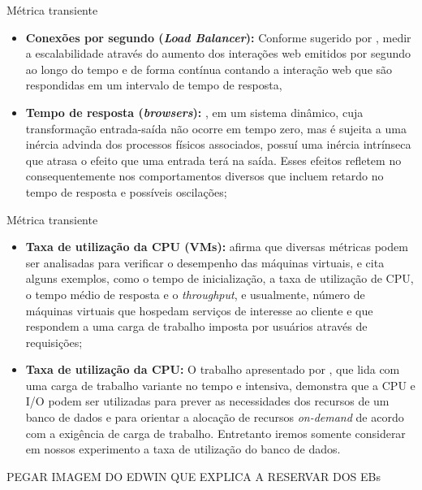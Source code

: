 \begin{frame}{Métrica transiente}
	\begin{itemize}
		\item \textbf{Conexões por segundo (\textit{Load Balancer}):} Conforme sugerido por \cite{Binnig2009}, medir a escalabilidade através do aumento dos interações web emitidos por segundo ao longo do tempo e de forma contínua contando a interação web que são respondidas em um intervalo de tempo de resposta,
		
		\item \textbf{Tempo de resposta (\textit{browsers}):} \cite{helder2014}, em um sistema dinâmico, cuja transformação entrada-saída não ocorre em tempo zero, mas é sujeita a uma inércia advinda dos processos físicos associados, possuí uma inércia intrínseca que atrasa o efeito que uma entrada terá na saída. Esses efeitos refletem no consequentemente nos comportamentos diversos que incluem retardo no tempo de resposta e possíveis oscilações; 	
	
	\end{itemize}
\end{frame}

\begin{frame}{Métrica transiente}
	\begin{itemize}
		\item \textbf{Taxa de utilização da CPU (VMs):} \cite{Nobile2013} afirma que diversas métricas podem ser analisadas para verificar o desempenho das máquinas virtuais, e cita alguns exemplos, como o tempo de inicialização, a taxa de utilização de CPU, o tempo médio de resposta e o \textit{throughput}, e usualmente, número de máquinas virtuais que hospedam serviços de interesse ao cliente e que respondem a uma carga de trabalho imposta por usuários através de requisições;
		
		\item \textbf{Taxa de utilização da CPU:} O trabalho apresentado por \cite{wang2009}, que lida com uma carga de trabalho variante no tempo e intensiva, demonstra que a CPU e I/O podem ser utilizadas para prever as necessidades dos recursos de um banco de dados e para orientar a alocação de recursos \textit{on-demand} de acordo com a exigência de carga de trabalho. Entretanto iremos somente considerar em nossos experimento a taxa de utilização do banco de dados.
	\end{itemize}
\end{frame}

\begin{frame}
	PEGAR IMAGEM DO EDWIN QUE EXPLICA A RESERVAR DOS EBs
\end{frame}

